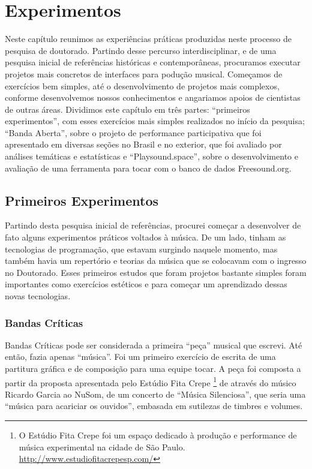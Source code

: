 

\chapter{Experimentos}
\label{ch:experimentos}

Neste capítulo reunimos as experiências práticas produzidas neste processo de pesquisa de doutorado. Partindo desse percurso interdisciplinar, e de uma pesquisa inicial de referências históricas e contemporâneas, procuramos executar projetos mais concretos de interfaces para podução musical. Começamos de exercícios bem simples, até o desenvolvimento de projetos mais complexos, conforme desenvolvemos nossos conhecimentos e angariamos apoios de cientistas de outras áreas. Dividimos este capítulo em três partes: ``primeiros experimentos'', com esses exercícios mais simples realizados no início da pesquisa; ``Banda Aberta'', sobre o projeto de performance participativa que foi apresentado em diversas seções no Brasil e no exterior, que foi avaliado por análises temáticas e estatísticas e ``Playsound.space'', sobre o desenvolvimento e avaliação de uma ferramenta para tocar com o banco de dados Freesound.org. 



\section{Primeiros Experimentos}
Partindo desta pesquisa inicial de referências, procurei começar a desenvolver de fato alguns experimentos práticos voltados à música. De um lado, tinham as tecnologias de programação, que estavam surgindo naquele momento, mas também havia um repertório e teorias da música que se colocavam com o ingresso no Doutorado. Esses primeiros estudos que foram projetos bastante simples foram importantes como exercícios estéticos e para começar um aprendizado dessas novas tecnologias.


\subsection{Bandas Críticas}
Bandas Críticas pode ser considerada a primeira ``peça'' musical que escrevi. Até então, fazia apenas ``música''. Foi um primeiro exercício de escrita de uma partitura gráfica e de composição para uma equipe tocar. A peça foi composta a partir da proposta apresentada pelo Estúdio Fita Crepe \footnote{O Estúdio Fita Crepe foi um espaço dedicado à produção e performance de música experimental na cidade de São Paulo. \url{http://www.estudiofitacrepesp.com/}} de através do músico Ricardo Garcia ao NuSom, de um concerto de ``Música Silenciosa'', que seria uma ``música para acariciar os ouvidos'', embasada em sutilezas de timbres e volumes.

